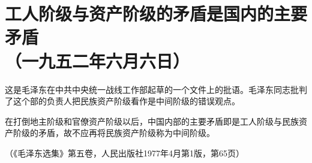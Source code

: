 \documentclass[cn,11pt,chinese]{elegantbook}
\def\myformat#1{\hfil\hfil #1}
\begin{document}
\newpage\section*{\myformat{工人阶级与资产阶级的矛盾是国内的主要矛盾}\\\myformat{（一九五二年六月六日）}}
\begin{introduction}\item  这是毛泽东在中共中央统一战线工作部起草的一个文件上的批语。毛泽东同志批判了这个部的负责人把民族资产阶级看作是中间阶级的错误观点。\end{introduction}
在打倒地主阶级和官僚资产阶级以后，中国内部的主要矛盾即是工人阶级与民族资产阶级的矛盾，故不应再将民族资产阶级称为中间阶级。\\
\begin{flushright}（《毛泽东选集》第五卷，人民出版社1977年4月第1版，第65页）\end{flushright}
\newpage
\end{document}
